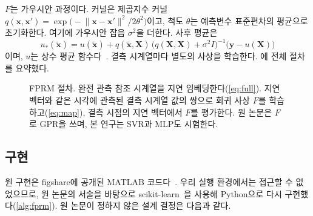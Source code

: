 \documentclass[11pt,a4paper]{article}
\begin{document}
$F$는 가우시안 과정이다.
커널은 제곱지수 커널 $q(\mathbf{x},\mathbf{x}') = \exp\!\big(-\lVert\mathbf{x}-\mathbf{x}'\rVert^2/2\theta^2\big)$이고, 척도 $\theta$는 예측변수 표준편차의 평균으로 초기화한다. 여기에 가우시안 잡음 $\sigma^2$을 더한다.
사후 평균은
\begin{equation}
  u_*(\tilde{\mathbf{x}}) = u(\tilde{\mathbf{x}}) + q(\tilde{\mathbf{x}},\mathbf{X})\,\big(q(\mathbf{X},\mathbf{X})+\sigma^2 I\big)^{-1}\big(\mathbf{y}-u(\mathbf{X})\big)
  \label{eq:gp}
\end{equation}
이며, $u$는 상수 평균 함수다~\cite[식 15--18]{wu2026fprm}.
결측 시계열마다 별도의 사상을 학습한다. 에 전체 절차를 요약했다.

\begin{figure}[t]
  \centering
  \newcommand{\PLa}{\textbf{완전 시계열} $x_i$}
  \newcommand{\PLb}{\textbf{결측 시계열} $x_j$}
  \newcommand{\PLc}{\textbf{완전 재구성}}
  \newcommand{\PLd}{\textbf{학습 쌍}}
  \newcommand{\PLe}{\textbf{사상 $F$ 학습}}
  \newcommand{\PLf}{\textbf{복원}}
  \newcommand{\PLg}{지연 임베딩}
  \newcommand{\PLh}{결측 시점 $k$}
  \resizebox{\linewidth}{!}{}
  \caption{FPRM 절차. 완전 관측 참조 시계열을 지연 임베딩한다(\cref{eq:full}). 지연 벡터와 같은 시각에 관측된 결측 시계열 값의 쌍으로 회귀 사상 $F$를 학습하고(\cref{eq:map}), 결측 시점의 지연 벡터에서 $F$를 평가한다. 원 논문은 $F$로 GPR을 쓰며, 본 연구는 SVR과 MLP도 시험한다.}
  \label{fig:pipeline}
\end{figure}

\subsection{구현}\label{sec:impl}

원 구현은 figshare에 공개된 MATLAB 코드다~\cite{wu2026fprm}.
우리 실행 환경에서는 접근할 수 없었으므로, 원 논문의 서술을 바탕으로 scikit-learn~\cite{pedregosa2011}을 사용해 Python으로 다시 구현했다(\cref{alg:fprm}).
원 논문이 정하지 않은 설계 결정은 다음과 같다.
\end{document}

